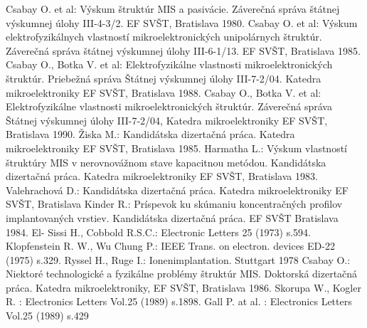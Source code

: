 \begin{thebibliography}{}
 Csabay O. et al: Výskum štruktúr MIS a
  pasivácie. Záverečná správa štátnej výskumnej úlohy III-4-3/2. EF
  SVŠT, Bratislava 1980.
 Csabay O. et al: Výskum elektrofyzikálnych
  vlastností mikroelektronických unipolárnych štruktúr. Záverečná
  správa štátnej výskumnej úlohy III-6-1/13. EF SVŠT, Bratislava 1985.
 Csabay O., Botka V. et al: Elektrofyzikálne
  vlastnosti mikroelektronických štruktúr. Priebežná správa Štátnej
  výskumnej úlohy III-7-2/04. Katedra mikroelektroniky EF SVŠT,
  Bratislava 1988.
 Csabay O., Botka V. et al: Elektrofyzikálne
  vlastnosti mikroelektronických štruktúr. Záverečná správa Štátnej
  výskumnej úlohy III-7-2/04, Katedra mikroelektroniky EF SVŠT,
  Bratislava 1990.
 Žiska M.: Kandidátska dizertačná práca. Katedra
  mikroelektroniky EF SVŠT, Bratislava 1985.
 Harmatha L.: Výskum vlastností štruktúry MIS v
  nerovnovážnom stave kapacitnou metódou. Kandidátska dizertačná
  práca. Katedra mikroelektroniky EF SVŠT, Bratislava 1983.
 Valehrachová D.: Kandidátska dizertačná
  práca. Katedra mikroelektroniky EF SVŠT, Bratislava
 Kinder R.: Príspevok ku skúmaniu koncentračných
  profilov implantovaných vrstiev. Kandidátska dizertačná práca. EF
  SVŠT Bratislava 1984.
El- Sissi H., Cobbold R.S.C.: Electronic Letters 25 (1973) s.594.
 Klopfenstein R. W., Wu Chung P.: IEEE Trans. on
  electron. devices ED-22 (1975) s.329.
Ryssel H., Ruge I.: Ionenimplantation. Stuttgart 1978
 Csabay O.: Niektoré technologické a fyzikálne
  problémy štruktúr MIS. Doktorská dizertačná práca. Katedra
  mikroelektroniky, EF SVŠT, Bratislava 1986.
Skorupa W., Kogler R. : Electronics Letters Vol.25 (1989) s.1898.
Gall P. at al. : Electronics Letters Vol.25 (1989) s.429
\end{thebibliography}
